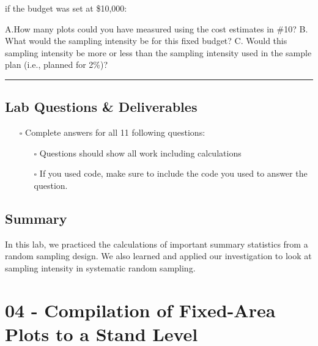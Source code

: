\documentclass[
  letterpaper,
]{book}
\providecommand{\tightlist}{%
  \setlength{\itemsep}{0pt}\setlength{\parskip}{0pt}}\usepackage{longtable,booktabs,array}
\begin{document}
if the budget was set at \$10,000:

A.How many plots could you have measured using the cost estimates in
\#10? B. What would the sampling intensity be for this fixed budget? C.
Would this sampling intensity be more or less than the sampling
intensity used in the sample plan (i.e., planned for 2\%)?

\begin{center}\rule{0.5\linewidth}{0.5pt}\end{center}

\hypertarget{lab-questions-deliverables-2}{%
\section*{Lab Questions \&
Deliverables}\label{lab-questions-deliverables-2}}


\begin{itemize}
\tightlist
\item[$\square$]
  Complete answers for all 11 following questions:

  \begin{itemize}
  \tightlist
  \item[$\square$]
    Questions should show all work including calculations
  \item[$\square$]
    If you used code, make sure to include the code you used to answer
    the question.
  \end{itemize}
\end{itemize}

\hypertarget{summary-2}{%
\section*{Summary}\label{summary-2}}


In this lab, we practiced the calculations of important summary
statistics from a random sampling design. We also learned and applied
our investigation to look at sampling intensity in systematic random
sampling.


\hypertarget{compilation-of-fixed-area-plots-to-a-stand-level}{%
\chapter{04 - Compilation of Fixed-Area Plots to a Stand
Level}\label{compilation-of-fixed-area-plots-to-a-stand-level}}
\end{document}
